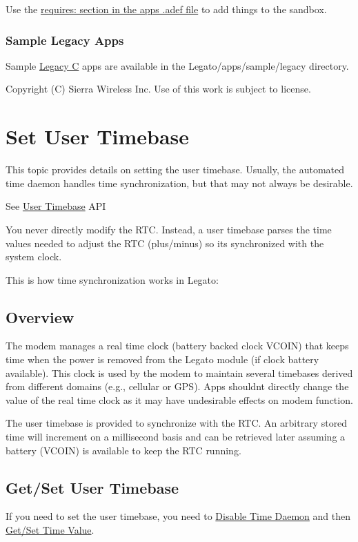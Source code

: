 Use the \hyperlink{def_files_adef_defFilesAdef_requires}{requires\+: section in the app\textquotesingle{}s .adef file} to add things to the sandbox.\hypertarget{how_to_port_legacy_c_howtoPortingLegacyC_sampleApps}{}\subsubsection{Sample Legacy Apps}\label{how_to_port_legacy_c_howtoPortingLegacyC_sampleApps}
Sample \hyperlink{sampleApps_legacy}{Legacy C} apps are available in the {\ttfamily Legato/apps/sample/legacy} directory.





Copyright (C) Sierra Wireless Inc. Use of this work is subject to license. \hypertarget{howToSetUserTimebase}{}\section{Set User Timebase}\label{howToSetUserTimebase}
This topic provides details on setting the user timebase. Usually, the automated time daemon handles time synchronization, but that may not always be desirable.

See \hyperlink{c_rtc}{User Timebase} A\+P\+I





You never directly modify the R\+T\+C. Instead, a user timebase parses the time values needed to adjust the R\+T\+C (plus/minus) so it\textquotesingle{}s synchronized with the system clock.

This is how time synchronization works in Legato\+:

\hypertarget{how_to_set_user_timebase_howToSetUserTimebase_overview}{}\subsection{Overview}\label{how_to_set_user_timebase_howToSetUserTimebase_overview}
The modem manages a real time clock (battery backed clock V\+C\+O\+I\+N) that keeps time when the power is removed from the Legato module (if clock battery available). This clock is used by the modem to maintain several timebases derived from different domains (e.\+g., cellular or G\+P\+S). Apps shouldn\textquotesingle{}t directly change the value of the real time clock as it may have undesirable effects on modem function.

The user timebase is provided to synchronize with the R\+T\+C. An arbitrary stored time will increment on a millisecond basis and can be retrieved later assuming a battery (V\+C\+O\+I\+N) is available to keep the R\+T\+C running.\hypertarget{how_to_set_user_timebase_howToSetUserTimebase_getandset}{}\subsection{Get/\+Set User Timebase}\label{how_to_set_user_timebase_howToSetUserTimebase_getandset}
If you need to set the user timebase, you need to \hyperlink{c_rtc_c_rtc_disableDaemon}{Disable Time Daemon} and then \hyperlink{c_rtc_c_rtc_getSet}{Get/\+Set Time Value}.

